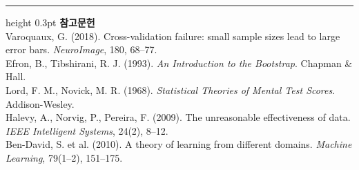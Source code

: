 \documentclass[10pt]{article}
\begin{document}
\vspace{0.6em}
\hrule height 0.3pt
\vspace{0.5em}
{\footnotesize
\textbf{참고문헌}\\[0.3em]
Varoquaux, G. (2018). Cross-validation failure: small sample sizes lead to large
error bars. \emph{NeuroImage}, 180, 68--77.\\[0.15em]
Efron, B., Tibshirani, R. J. (1993). \emph{An Introduction to the Bootstrap}.
Chapman \& Hall.\\[0.15em]
Lord, F. M., Novick, M. R. (1968). \emph{Statistical Theories of Mental Test
Scores}. Addison-Wesley.\\[0.15em]
Halevy, A., Norvig, P., Pereira, F. (2009). The unreasonable effectiveness of
data. \emph{IEEE Intelligent Systems}, 24(2), 8--12.\\[0.15em]
Ben-David, S. et al. (2010). A theory of learning from different domains.
\emph{Machine Learning}, 79(1--2), 151--175.
}
\end{document}
